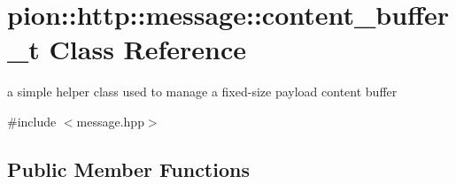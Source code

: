 \hypertarget{classpion_1_1http_1_1message_1_1content__buffer__t}{\section{pion\-:\-:http\-:\-:message\-:\-:content\-\_\-buffer\-\_\-t Class Reference}
\label{classpion_1_1http_1_1message_1_1content__buffer__t}
}


a simple helper class used to manage a fixed-\/size payload content buffer  




{\ttfamily \#include $<$message.\-hpp$>$}

\subsection*{Public Member Functions}
